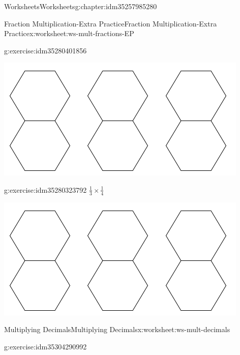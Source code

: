 \documentclass[twoside,11pt,]{book}
\begin{document}
\begin{chapterptx}{Worksheets}{}{Worksheets}{}{}{g:chapter:idm35257985280}
\begin{worksheet-section-numberless}{Fraction Multiplication-Extra Practice}{}{Fraction Multiplication-Extra Practice}{}{}{x:worksheet:ws-mult-fractions-EP}
\begin{divisionexercise}{5}{}{}{g:exercise:idm35280401856}
\begin{sidebyside}{1}{0.1}{0.1}{0}
\begin{sbspanel}{0.8}
\includegraphics[width=1\linewidth]{images/3-double-hexagons.png}
\end{sbspanel}%
\end{sidebyside}%
\end{divisionexercise}%
\begin{divisionexercise}{6}{}{}{g:exercise:idm35280323792}%
\(\frac{1}{3} \times \frac{1}{4} \)%
\begin{sidebyside}{1}{0.1}{0.1}{0}%
\begin{sbspanel}{0.8}%
\includegraphics[width=1\linewidth]{images/3-double-hexagons.png}
\end{sbspanel}%
\end{sidebyside}%
\end{divisionexercise}%
\end{worksheet-section-numberless}
\restoregeometry
%
%
\typeout{************************************************}
\typeout{************************************************}
%
\begin{worksheet-section-numberless}{Multiplying Decimals}{}{Multiplying Decimals}{}{}{x:worksheet:ws-mult-decimals}
\begin{divisionexercise}{1}{}{}{g:exercise:idm35304290992}%

\end{divisionexercise}
\end{worksheet-section-numberless}
\end{chapterptx}
\end{document}
